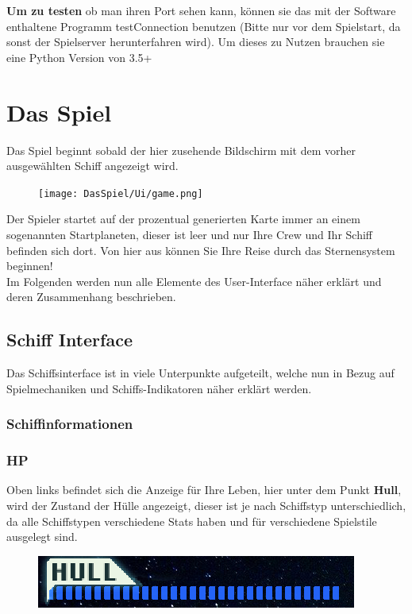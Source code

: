 \documentclass[fontsize=12pt,paper=a4,twoside]{scrartcl}
\begin{document}
\textbf{Um zu testen} ob man ihren Port sehen kann, können sie das mit der Software enthaltene Programm testConnection benutzen (Bitte nur vor dem Spielstart, da sonst der Spielserver herunterfahren wird). Um dieses zu Nutzen brauchen sie eine Python Version von 3.5+ 

\newpage
\section{Das Spiel}
Das Spiel beginnt sobald der hier zusehende Bildschirm mit dem vorher ausgewählten Schiff angezeigt wird. 
\begin{figure}[H]
\centering
\texttt{[image: DasSpiel/Ui/game.png]}
\end{figure} 

Der Spieler startet auf der prozentual generierten Karte immer an einem sogenannten Startplaneten, dieser ist leer und nur Ihre Crew und Ihr Schiff befinden sich dort. Von hier aus können Sie Ihre Reise durch das Sternensystem beginnen!  
\\
Im Folgenden werden nun alle Elemente des User-Interface näher erklärt und deren Zusammenhang beschrieben.


\subsection{Schiff Interface}

Das Schiffsinterface ist in viele Unterpunkte aufgeteilt, welche nun in Bezug auf Spielmechaniken und Schiffs-Indikatoren näher erklärt werden.
\\


\subsubsection{Schiffinformationen}
\subsubsection{HP}
Oben links befindet sich die Anzeige für Ihre Leben, hier unter dem Punkt \textbf{Hull}, wird der Zustand der Hülle angezeigt, dieser ist je nach Schiffstyp unterschiedlich, da alle Schiffstypen verschiedene Stats haben und für verschiedene Spielstile ausgelegt sind. 

\begin{figure}[H]
\centering
\includegraphics[width=0.8\linewidth]{DasSpiel/Ui/HP.png}
\end{figure} 
\end{document}
